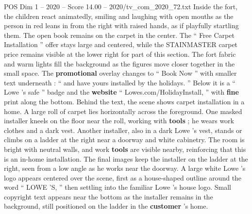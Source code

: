 \begin{textsample}{POS Dim 1 – 2020 – Score 14.00 – 2020/tv\_com\_2020\_72.txt}
Inside the fort, the children react animatedly, smiling and laughing with open mouths as the person in red leans in from the right with raised hands, as if playfully startling them.
The open book remains on the carpet in the center.
The “ Free Carpet Installation ” offer stays large and centered, while the STAINMASTER carpet price remains visible at the lower right for part of this section.
The fort fabric and warm lights fill the background as the figures move closer together in the small space.
The \textbf{promotional} overlay changes to “ Book Now ” with smaller text underneath : “ and have yours installed by the holidays. ” Below it is a “ Lowe ’s safe ” badge and the \textbf{website} “ Lowes.com/HolidayInstall, ” with \textbf{fine} print along the bottom.
Behind the text, the scene shows carpet installation in a home.
A large roll of carpet lies horizontally across the foreground.
One masked installer kneels on the floor near the roll, working with \textbf{tools} ; he wears work clothes and a dark vest.
Another installer, also in a dark Lowe ’s vest, stands or climbs on a ladder at the right near a doorway and white cabinetry.
The room is bright with neutral walls, and work \textbf{tools} are visible nearby, reinforcing that this is an in-home installation.
The final images keep the installer on the ladder at the right, seen from a low angle as he works near the doorway.
A large white Lowe ’s logo appears centered over the scene, first as a house-shaped outline around the word “ LOWE ’S, ” then settling into the familiar Lowe ’s house logo.
Small copyright text appears near the bottom as the installer remains in the background, still positioned on the ladder in the \textbf{customer} ’s home.

\end{textsample}

